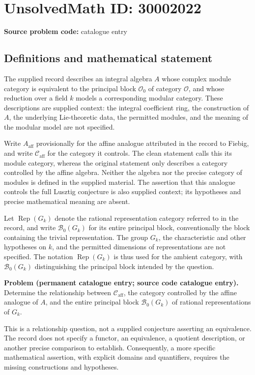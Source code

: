 \documentclass[11pt]{article}
\begin{document}
\section*{UnsolvedMath ID: 30002022}
\textbf{Source problem code:} catalogue entry
\subsection{Definitions and mathematical statement}
The supplied record describes an integral algebra \(A\) whose complex module category is equivalent to the principal block \(\mathcal O_0\) of category \(\mathcal O\), and whose reduction over a field \(k\) models a corresponding modular category. These descriptions are supplied context: the integral coefficient ring, the construction of \(A\), the underlying Lie-theoretic data, the permitted modules, and the meaning of the modular model are not specified.

Write \(A_{\mathrm{aff}}\) provisionally for the affine analogue attributed in the record to Fiebig, and write \(\mathscr C_{\mathrm{aff}}\) for the category it controls. The clean statement calls this its module category, whereas the original statement only describes a category controlled by the affine algebra. Neither the algebra nor the precise category of modules is defined in the supplied material. The assertion that this analogue controls the full Lusztig conjecture is also supplied context; its hypotheses and precise mathematical meaning are absent.

Let \(\operatorname{Rep}(G_k)\) denote the rational representation category referred to in the record, and write \(\mathcal B_0(G_k)\) for its entire principal block, conventionally the block containing the trivial representation. The group \(G_k\), the characteristic and other hypotheses on \(k\), and the permitted dimensions of representations are not specified. The notation \(\operatorname{Rep}(G_k)\) is thus used for the ambient category, with \(\mathcal B_0(G_k)\) distinguishing the principal block intended by the question.

\textbf{Problem (permanent catalogue entry; source code catalogue entry).} Determine the relationship between \(\mathscr C_{\mathrm{aff}}\), the category controlled by the affine analogue of \(A\), and the entire principal block \(\mathcal B_0(G_k)\) of rational representations of \(G_k\).

This is a relationship question, not a supplied conjecture asserting an equivalence. The record does not specify a functor, an equivalence, a quotient description, or another precise comparison to establish. Consequently, a more specific mathematical assertion, with explicit domains and quantifiers, requires the missing constructions and hypotheses.
\end{document}
